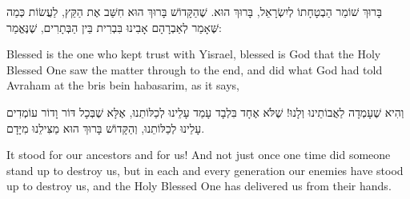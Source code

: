 \vspace{2em}

בָּרוּךְ שׁוֹמֵר הַבְטָחָתוֹ לְיִשְׂרָאֵל, בָּרוּךְ הוּא. שֶׁהַקָּדוֹשׁ בָּרוּךְ הוּא חִשַּׁב אֶת הַקֵּץ, לַעֲשׂוֹת כְּמַה שֶּׁאָמַר לְאַבְרָהָם אָבִינוּ בִּבְרִית בֵּין הַבְּתָרִים, שֶׁנֶּאֱמַר: 

\begin{english}
Blessed is the one who kept trust with Yisrael, blessed is God that the Holy Blessed One saw the matter through to the end, and did what God had told Avraham at the bris bein habasarim, as it says, 
\end{english}


וְהִיא שֶׁעָמְדָה לַאֲבוֹתֵינוּ וְלָנוּ! שֶׁלֹּא אֶחָד בִּלְבָד עָמַד עָלֵינוּ לְכַלּוֹתֵנוּ, אֶלָּא שֶׁבְּכָל דּוֹר וָדוֹר עוֹמְדִים עָלֵינוּ לְכַלּוֹתֵנוּ, וְהַקָּדוֹשׁ בָּרוּךְ הוּא מַצִּילֵנוּ מִיָּדָם.

\begin{english}
It stood for our ancestors and for us! And not just once one time did someone stand up to destroy us, but in each and every generation our enemies have stood up to destroy us, and the Holy Blessed One has delivered us from their hands.
\end{english}


\break

\begin{center}
{\large \bfseries \textcolor{light-gray}{}}
\end{center}


